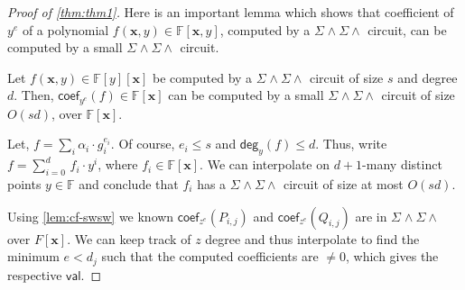 \documentclass[10pt,a4paper]{article}
\newcommand{\F}{\mathbb{F}}
\newcommand{\x}{{\boldsymbol x}}
\newcommand{\val}{\mathsf{val}}
\newcommand{\cf}{\mathsf{coef}}
\newcommand{\pdeg}{\mathsf{deg}}
\newcommand{\SWSU}[2]{\Sigma^{#1}\!\wedge\!\Sigma\!\wedge^{#2}}
\numberwithin{equation}{section}
\newenvironment{proof-sketch}{\medskip\noindent{\em Proof Sketch.}}{\qed\bigskip}
\begin{document}
\begin{proof}[Proof of \autoref{thm:thm1}]
Here is an important lemma which shows that coefficient of $y^e$ of a polynomial $f(\x,y) \in \F[\x,y]$, computed by a $\SWSU{}{}$ circuit, can be computed by a small $\SWSU{}{}$ circuit.

\begin{lemma}\label{lem:cf-swsw}
Let $f(\x,y) \in \F[y][\x]$ be computed by a $\SWSU{}{}$ circuit of size $s$ and degree $d$. Then, $\cf_{y^e}(f) \in \F[\x]$ can be computed by a small $\SWSU{}{}$ circuit of size $O(sd)$, over $\F[\x]$.
\end{lemma}
\begin{proof-sketch}
    Let, $f= \sum_{i} \alpha_i \cdot g_i^{e_i}$. Of course, $e_i \le s$ and $\pdeg_{y}(f) \le d$. Thus, write $f=\sum_{i=0}^{d}\,f_i\cdot y^i$, where $f_i \in \F[\x]$. We can interpolate on $d+1$-many distinct points $y\in \F$ and conclude that $f_i$ has a $\SWSU{}{}{}$ circuit of size at most $O(sd)$. 
\end{proof-sketch}

\noindent Using \autoref{lem:cf-swsw} we known $\cf_{z^e}(P_{i,j})$ and $\cf_{z^e}(Q_{i,j})$ are in $\SWSU{}{}$ over $F[\x]$. We can keep track of $z$ degree and thus interpolate to find the minimum $e < d_j$ such that the computed coefficients are $\ne 0$, which gives the respective $\val$.

\smallskip


\end{proof}
\end{document}
